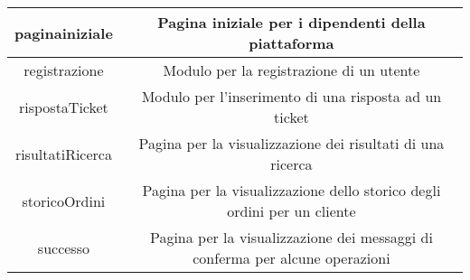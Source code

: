 \documentclass[12pt,a4paper]{article}
\begin{document}
\begin{center}
\begin{tabular}{|c|c|}
paginainiziale & \begin{minipage}{10cm} \vspace{5pt}
Pagina iniziale per i dipendenti della piattaforma \vspace{5pt}
\end{minipage} \\ \hline

registrazione & \begin{minipage}{10cm} \vspace{5pt}
Modulo per la registrazione di un utente \vspace{5pt}
\end{minipage} \\ \hline

rispostaTicket & \begin{minipage}{10cm} \vspace{5pt}
Modulo per l'inserimento di una risposta ad un ticket \vspace{5pt}
\end{minipage} \\ \hline

risultatiRicerca & \begin{minipage}{10cm} \vspace{5pt}
Pagina per la visualizzazione dei risultati di una ricerca \vspace{5pt}
\end{minipage} \\ \hline

storicoOrdini & \begin{minipage}{10cm} \vspace{5pt}
Pagina per la visualizzazione dello storico degli ordini per un cliente \vspace{5pt}
\end{minipage} \\ \hline

successo & \begin{minipage}{10cm} \vspace{5pt}
Pagina per la visualizzazione dei messaggi di conferma per alcune operazioni \vspace{5pt}
\end{minipage} \\ \hline

\end{tabular}
\end{center}
\end{document}
